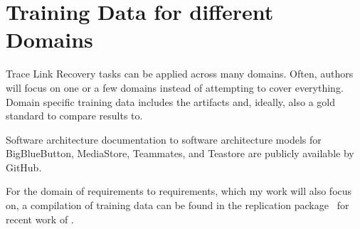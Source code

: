 \section{Training Data for different Domains}
Trace Link Recovery tasks can be applied across many domains.
Often, authors will focus on one or a few domains instead of attempting to cover everything.
Domain specific training data includes the artifacts and, ideally, also a gold standard to compare results to.



Software architecture documentation to software architecture models for BigBlueButton, MediaStore, Teammates, and Teastore are publicly available by  GitHub.

For the domain of requirements to requirements, which my work will also focus on, a compilation of training data can be found in the replication package~\cite{hey2025ReplicationPackage} for recent work of \citeauthor{hey2025RequirementsTraceability}.
